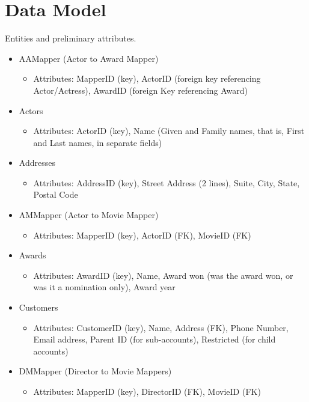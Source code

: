 \documentclass[letterpaper,12pt]{article}
\begin{document}
\section{Data Model}
Entities and preliminary attributes.
\begin{itemize}
	\item AAMapper (Actor to Award Mapper)
	      \begin{itemize}
		      \item Attributes: MapperID (key), ActorID (foreign key referencing Actor/Actress), AwardID (foreign Key referencing Award)
	      \end{itemize}
	\item Actors
	      \begin{itemize}
		      \item Attributes: ActorID (key), Name (Given and Family names, that is, First and Last names, in separate fields)
	      \end{itemize}
	\item Addresses
	      \begin{itemize}
		      \item Attributes: AddressID (key), Street Address (2 lines), Suite, City, State, Postal Code
	      \end{itemize}
	\item AMMapper (Actor to Movie Mapper)
	      \begin{itemize}
		      \item Attributes: MapperID (key), ActorID (FK), MovieID (FK)
	      \end{itemize}
	\item Awards
	      \begin{itemize}
		      \item Attributes: AwardID (key), Name, Award won (was the award won, or was it a nomination only), Award year
	      \end{itemize}
	\item Customers
	      \begin{itemize}
		      \item Attributes: CustomerID (key), Name, Address (FK), Phone Number, Email address, Parent ID (for sub-accounts), Restricted (for child accounts)
	      \end{itemize}
	\item DMMapper (Director to Movie Mappers)
	      \begin{itemize}
		      \item Attributes: MapperID (key), DirectorID (FK), MovieID (FK)
	      \end{itemize}

\end{itemize}
\end{document}
